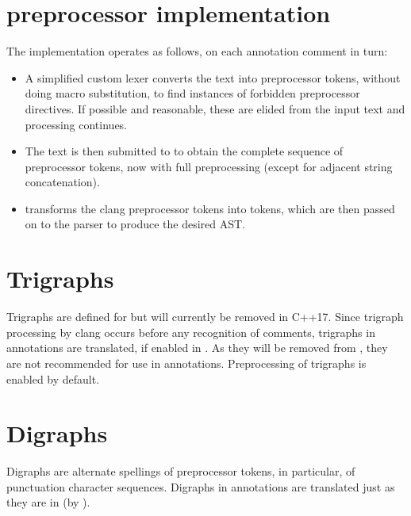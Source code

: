 \section{\fclang preprocessor implementation}
The \fclang implementation operates as follows, on each \acslpp annotation comment in turn:
\begin{itemize}
\item A simplified custom lexer converts the text into preprocessor tokens, without doing macro substitution, to find instances of forbidden preprocessor directives. If possible and reasonable, these are elided from the input text and processing continues.
\item The text is then submitted to \cl to obtain the complete sequence of preprocessor tokens, now with full preprocessing (except for adjacent string concatenation).
\item \fcl transforms the clang preprocessor tokens into \acslpp tokens, which are then passed on to the \acslpp parser to produce the desired AST.
\end{itemize}

\section{Trigraphs}

Trigraphs are defined for \cpp but will currently be removed in C++17. Since trigraph processing by clang occurs before any recognition of comments, trigraphs in \acslpp annotations are translated, if enabled in \clang. As they will be removed from \cpp, they are not recommended for use in \acslpp annotations. Preprocessing of trigraphs is enabled by default.

\section{Digraphs}
Digraphs are alternate spellings of preprocessor tokens, in particular, of
punctuation character sequences. Digraphs in \acslpp annotations are translated just as they are in \cpp (by \clang).

